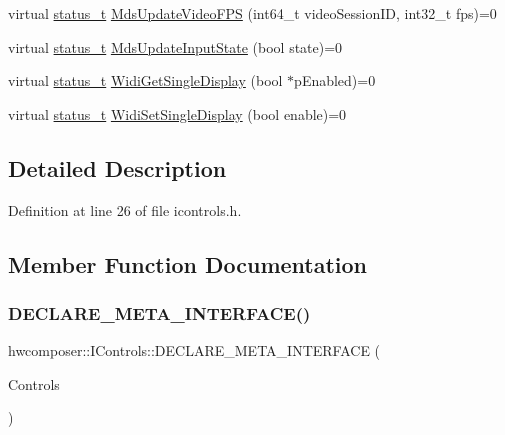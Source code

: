 \begin{DoxyCompactItemize}
\item 
virtual \mbox{\hyperlink{hwcserviceapi_8h_a3806fb2027d9a316d8ca8d9b8b8eb96f}{status\+\_\+t}} \mbox{\hyperlink{classhwcomposer_1_1IControls_a15c005a5a1c9c0a5a30ffebefdfb6b6f}{Mds\+Update\+Video\+F\+PS}} (int64\+\_\+t video\+Session\+ID, int32\+\_\+t fps)=0
\item 
virtual \mbox{\hyperlink{hwcserviceapi_8h_a3806fb2027d9a316d8ca8d9b8b8eb96f}{status\+\_\+t}} \mbox{\hyperlink{classhwcomposer_1_1IControls_a762f814efdb6c21fdc156a5a19014a0e}{Mds\+Update\+Input\+State}} (bool state)=0
\item 
virtual \mbox{\hyperlink{hwcserviceapi_8h_a3806fb2027d9a316d8ca8d9b8b8eb96f}{status\+\_\+t}} \mbox{\hyperlink{classhwcomposer_1_1IControls_a69047ef7180e98e50661dc75ab8fc794}{Widi\+Get\+Single\+Display}} (bool $\ast$p\+Enabled)=0
\item 
virtual \mbox{\hyperlink{hwcserviceapi_8h_a3806fb2027d9a316d8ca8d9b8b8eb96f}{status\+\_\+t}} \mbox{\hyperlink{classhwcomposer_1_1IControls_abebb8408a1525be64b060b2af76f06f9}{Widi\+Set\+Single\+Display}} (bool enable)=0
\end{DoxyCompactItemize}


\subsection{Detailed Description}


Definition at line 26 of file icontrols.\+h.



\subsection{Member Function Documentation}
\mbox{\label{classhwcomposer_1_1IControls_a1049f9600bef7b150a7fb457a79e4756}} 
\subsubsection{\texorpdfstring{D\+E\+C\+L\+A\+R\+E\+\_\+\+M\+E\+T\+A\+\_\+\+I\+N\+T\+E\+R\+F\+A\+C\+E()}{DECLARE\_META\_INTERFACE()}}
{\footnotesize\ttfamily hwcomposer\+::\+I\+Controls\+::\+D\+E\+C\+L\+A\+R\+E\+\_\+\+M\+E\+T\+A\+\_\+\+I\+N\+T\+E\+R\+F\+A\+CE (\begin{DoxyParamCaption}\item[{Controls}]{ }\end{DoxyParamCaption})}

